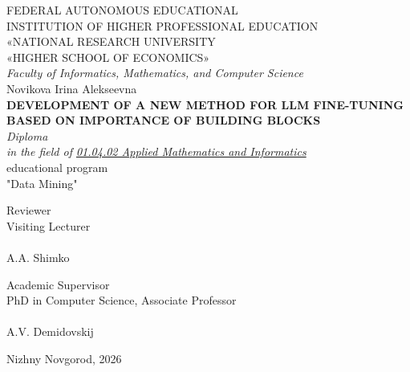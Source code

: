 \begin{titlepage}

    \begin{center}
        FEDERAL AUTONOMOUS EDUCATIONAL \\
        INSTITUTION OF HIGHER PROFESSIONAL 
        EDUCATION \\
        «NATIONAL RESEARCH UNIVERSITY \\
        «HIGHER SCHOOL OF ECONOMICS»
\\
\vspace{10mm}
        \textit {
            Faculty of Informatics, Mathematics, and Computer Science
        }
        \\
        \vspace{30mm}
        Novikova Irina Alekseevna \\
        \textbf{DEVELOPMENT OF A NEW METHOD FOR LLM FINE-TUNING BASED ON IMPORTANCE OF BUILDING BLOCKS}
        \vspace{1mm}
        \\
        \textit{Diploma} \\
        \textit{in the field of \underline{01.04.02 Applied Mathematics and Informatics}} \\

        educational program \\
        "Data Mining"\\
    \end{center}

\vspace{50mm}
\begin{minipage}{.45\linewidth}
    \begin{flushleft}
        Reviewer \\
        Visiting Lecturer \\
        \signatureline[6cm]{}
        \\
        A.A. Shimko
    \end{flushleft}
\end{minipage}
 \hfill
\begin{minipage}{.45\linewidth}
    \begin{flushright}
        Academic Supervisor \\
        PhD in Computer Science, Associate Professor \\
        \signatureline[6cm]{}
        \\
        A.V. Demidovskij
    \end{flushright}
\end{minipage}


\begin{center}
    \vspace*{\fill}
    Nizhny Novgorod, 2026
\end{center}

\end{titlepage}